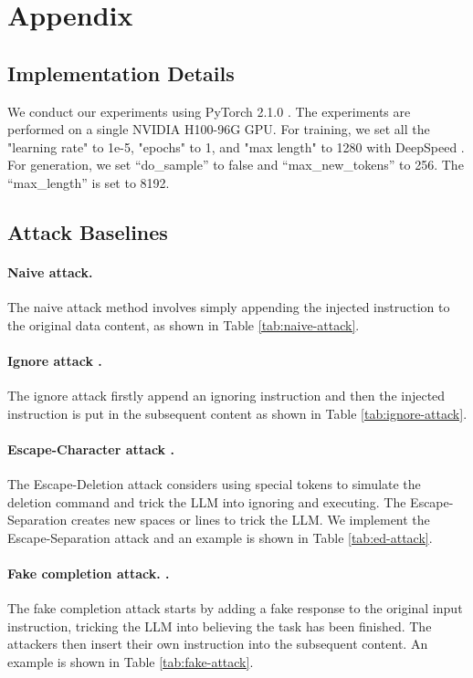 \section{Appendix}

\subsection{Implementation Details}
 We conduct our experiments using PyTorch 2.1.0 \cite{paszke2019pytorch}. The experiments are performed on a single NVIDIA H100-96G GPU.  For  training, we set all the "learning rate" to 1e-5, "epochs" to 1, and "max length" to 1280 with DeepSpeed \cite{rajbhandari2020zero}.  For generation, we set ``do\_sample'' to false and ``max\_new\_tokens'' to 256. The “max\_length” is set to 8192.

 
\subsection{Attack Baselines}
\label{app:attack}
\paragraph{Naive attack.} The naive attack method involves simply appending the injected instruction to the original data content, as shown in Table \ref{tab:naive-attack}.
\paragraph{Ignore attack \cite{perez2022ignore}. } The ignore attack firstly append an ignoring instruction and then the injected instruction is put in the subsequent content as shown in Table \ref{tab:ignore-attack}. 
\paragraph{Escape-Character attack \cite{breitenbach2023dont,liu2024formalizing}.} The Escape-Deletion attack \cite{breitenbach2023dont} considers using special tokens to simulate the deletion command and trick the LLM into ignoring and executing. The Escape-Separation \cite{liu2024formalizing} creates new spaces or lines to trick the LLM. We implement the Escape-Separation attack and an example is shown in Table \ref{tab:ed-attack}.
\paragraph{Fake completion attack. \cite{willison_2023}.} The fake completion attack starts by adding a fake response to the original input instruction, tricking the LLM into believing the task has been finished. The attackers then insert their own instruction into the subsequent content. An example is shown in Table \ref{tab:fake-attack}.
